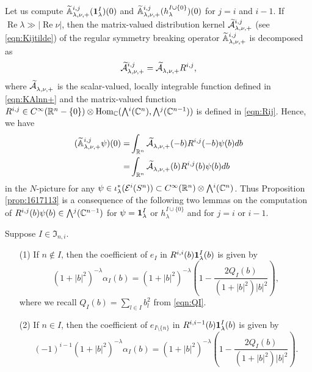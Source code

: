Let us compute 
$
 {\widetilde{\mathbb{A}}}_{{\lambda},{\nu},{+}}^{{i,j}}
 ({\bf{1}}_{\lambda}^{I})(0)
$
 and 
$
 {\widetilde{\mathbb{A}}}_{{\lambda},{\nu},{+}}^{{i,j}}
 (h_{\lambda}^{I \cup \{0\}})(0)
$
 for $j=i$ and $i-1$.  
If $\operatorname{Re} \lambda \gg |\operatorname{Re} \nu|$, 
 then the matrix-valued distribution kernel 
 $\widetilde{{\mathcal{A}}}_{{\lambda},{\nu},{+}}^{{i,j}}$
 (see \eqref{eqn:Kijtilde})
 of the regular symmetry breaking operator
 ${\widetilde{\mathbb{A}}}_{{\lambda},{\nu},{+}}^{{i,j}}$ is decomposed as 
\[
   \widetilde{{\mathcal{A}}}_{{\lambda},{\nu},{+}}^{{i,j}}= \widetilde{{\mathcal{A}}}_{{\lambda},{\nu},{+}}^{{}} R^{{i},{j}}, 
\]
where 
$\widetilde{{\mathcal{A}}}_{{\lambda},{\nu},{+}}^{{}}$ is the scalar-valued,
 locally integrable function
 defined in \eqref{eqn:KAlnn+}
 and the matrix-valued function 
$
\Rij ij \in C^{\infty}({\mathbb{R}}^n \setminus \{0\})
 \otimes 
 {\operatorname{Hom}}_{{\mathbb{C}}}(\Exterior^i({\mathbb{C}}^n), \Exterior^j({\mathbb{C}}^{n-1}))$
 is defined in \eqref{eqn:Rij}.  
Hence,
 we have
\begin{align*}
({\widetilde{\mathbb{A}}}_{{\lambda},{\nu},{+}}^{{i,j}} \psi)(0)
=&\int_{\mathbb{R}^n} \widetilde{{\mathcal{A}}}_{{\lambda},{\nu},{+}}^{{}}(-b) R^{{i},{j}} (-b)\psi(b) d b
\\
=&\int_{\mathbb{R}^n} \widetilde{{\mathcal{A}}}_{{\lambda},{\nu},{+}}^{{}}(b) R^{{i},{j}} (b)\psi(b) d b
\end{align*}
in the $N$-picture for any $\psi \in \iota_{\lambda}^{\ast}({\mathcal{E}}^i(S^n))\subset C^{\infty}(\mathbb{R}^n) \otimes \Exterior^i(\mathbb{C}^n)$.  
Thus Proposition \ref{prop:1617113} is a consequence
 of the following two lemmas
 on the computation of $\Rij i j(b) \psi(b) \in \Exterior^j({\mathbb{C}}^{n-1})$
 for $\psi={\bf{1}}_{\lambda}^{I}$
 or $h_{\lambda}^{I \cup \{0\}}$ and 
 for $j=i$ or $i-1$.  
\begin{lemma}
\label{lem:eIRone}
Suppose $I \in {\mathfrak{I}}_{n,i}$.  
\begin{enumerate}
\item[{\rm{(1)}}]
If $n \not \in I$, 
then the coefficient of $e_I$
 in 
$
  R^{{i},{i}} (b) {\bf{1}}_{\lambda}^{I}(b)
$
is given by 
\[
  (1+|b|^2)^{-\lambda} \alpha_I(b)
  =
 (1+|b|^2)^{-\lambda}(1-\frac{2Q_I(b)}{(1+|b|^2)|b|^2}), 
\]
where we recall 
 $Q_I(b)=\sum_{l \in I}b_l^2$ from \eqref{eqn:QI}.  
\item[{\rm{(2)}}]
If $n \in I$, 
then the coefficient of $e_{I\setminus \{ n \}}$
 in 
$
  R^{{i},{i-1}} (b) {\bf{1}}_{\lambda}^{I}(b)
$
is given by 
\[
  (-1)^{i-1}(1+|b|^2)^{-\lambda} \alpha_I(b)
  = 
  (1+|b|^2)^{-\lambda} (1-\frac{2Q_I(b)}{(1+|b|^2)|b|^2}).  
\]
\end{enumerate}
\end{lemma}

